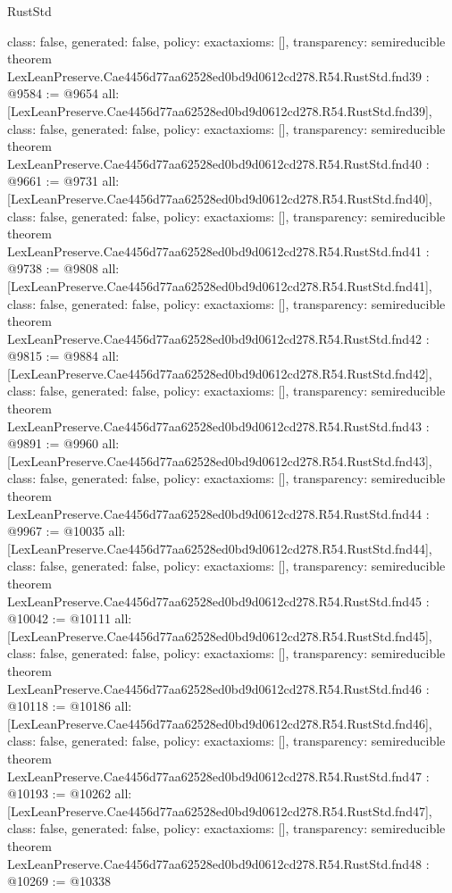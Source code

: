 \begin{lexlean}{RustStd}
\begin{coremodule}
{  class: false,
  generated: false,
  policy: exact{axioms: []},
  transparency: semireducible
}
theorem LexLeanPreserve.Cae4456d77aa62528ed0bd9d0612cd278.R54.RustStd.fnd39 : @9584 := @9654 {
  all: [LexLeanPreserve.Cae4456d77aa62528ed0bd9d0612cd278.R54.RustStd.fnd39],
  class: false,
  generated: false,
  policy: exact{axioms: []},
  transparency: semireducible
}
theorem LexLeanPreserve.Cae4456d77aa62528ed0bd9d0612cd278.R54.RustStd.fnd40 : @9661 := @9731 {
  all: [LexLeanPreserve.Cae4456d77aa62528ed0bd9d0612cd278.R54.RustStd.fnd40],
  class: false,
  generated: false,
  policy: exact{axioms: []},
  transparency: semireducible
}
theorem LexLeanPreserve.Cae4456d77aa62528ed0bd9d0612cd278.R54.RustStd.fnd41 : @9738 := @9808 {
  all: [LexLeanPreserve.Cae4456d77aa62528ed0bd9d0612cd278.R54.RustStd.fnd41],
  class: false,
  generated: false,
  policy: exact{axioms: []},
  transparency: semireducible
}
theorem LexLeanPreserve.Cae4456d77aa62528ed0bd9d0612cd278.R54.RustStd.fnd42 : @9815 := @9884 {
  all: [LexLeanPreserve.Cae4456d77aa62528ed0bd9d0612cd278.R54.RustStd.fnd42],
  class: false,
  generated: false,
  policy: exact{axioms: []},
  transparency: semireducible
}
theorem LexLeanPreserve.Cae4456d77aa62528ed0bd9d0612cd278.R54.RustStd.fnd43 : @9891 := @9960 {
  all: [LexLeanPreserve.Cae4456d77aa62528ed0bd9d0612cd278.R54.RustStd.fnd43],
  class: false,
  generated: false,
  policy: exact{axioms: []},
  transparency: semireducible
}
theorem LexLeanPreserve.Cae4456d77aa62528ed0bd9d0612cd278.R54.RustStd.fnd44 : @9967 := @10035 {
  all: [LexLeanPreserve.Cae4456d77aa62528ed0bd9d0612cd278.R54.RustStd.fnd44],
  class: false,
  generated: false,
  policy: exact{axioms: []},
  transparency: semireducible
}
theorem LexLeanPreserve.Cae4456d77aa62528ed0bd9d0612cd278.R54.RustStd.fnd45 : @10042 := @10111 {
  all: [LexLeanPreserve.Cae4456d77aa62528ed0bd9d0612cd278.R54.RustStd.fnd45],
  class: false,
  generated: false,
  policy: exact{axioms: []},
  transparency: semireducible
}
theorem LexLeanPreserve.Cae4456d77aa62528ed0bd9d0612cd278.R54.RustStd.fnd46 : @10118 := @10186 {
  all: [LexLeanPreserve.Cae4456d77aa62528ed0bd9d0612cd278.R54.RustStd.fnd46],
  class: false,
  generated: false,
  policy: exact{axioms: []},
  transparency: semireducible
}
theorem LexLeanPreserve.Cae4456d77aa62528ed0bd9d0612cd278.R54.RustStd.fnd47 : @10193 := @10262 {
  all: [LexLeanPreserve.Cae4456d77aa62528ed0bd9d0612cd278.R54.RustStd.fnd47],
  class: false,
  generated: false,
  policy: exact{axioms: []},
  transparency: semireducible
}
theorem LexLeanPreserve.Cae4456d77aa62528ed0bd9d0612cd278.R54.RustStd.fnd48 : @10269 := @10338 {
}
\end{coremodule}
\end{lexlean}
